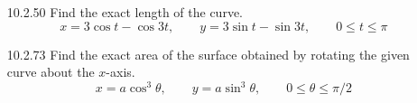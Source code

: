 \documentclass{article}
\begin{document}
\begin{enumerate}
\vspace{4cm}

\item[10.2.50]
    Find the exact length of the curve. \[x=3\cos{t}-\cos{3t}, \qquad y=3\sin{t}-\sin{3t}, \qquad 0 \leqslant t \leqslant \pi\]

\vspace{5cm}

\item[10.2.73]
    Find the exact area of the surface obtained by rotating the given curve about the $x$-axis.
    \[x=a\cos^{3}{\theta}, \qquad y=a\sin^{3}{\theta}, \qquad 0 \leqslant \theta \leqslant \pi/2\]

\end{enumerate}
\end{document}
